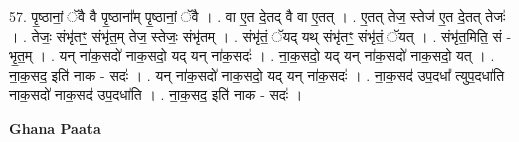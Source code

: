 \documentclass[17pt]{extarticle}
\begin{document}
57. पृ॒ष्ठानां॒ ॅवै वै पृ॒ष्ठाना᳚म् पृ॒ष्ठानां॒ ॅवै । . वा ए॒त दे॒तद् वै वा ए॒तत् । . ए॒तत् तेज॒ स्तेज॑ ए॒त दे॒तत् तेजः॑ । . तेजः॒ संभृ॑तꣳ॒॒ संभृ॑त॒म् तेज॒ स्तेजः॒ संभृ॑तम् । . संभृ॑तं॒ ॅयद् यथ् संभृ॑तꣳ॒॒ संभृ॑तं॒ ॅयत् । . संभृ॑त॒मिति॒ सं - भृ॒त॒म् । . यन् ना॑क॒सदो॑ नाक॒सदो॒ यद् यन् ना॑क॒सदः॑ । . ना॒क॒सदो॒ यद् यन् ना॑क॒सदो॑ नाक॒सदो॒ यत् । . ना॒क॒सद॒ इति॑ नाक - सदः॑ । . यन् ना॑क॒सदो॑ नाक॒सदो॒ यद् यन् ना॑क॒सदः॑ । . ना॒क॒सद॑ उप॒दधा᳚ त्युप॒दधा॑ति नाक॒सदो॑ नाक॒सद॑ उप॒दधा॑ति । . ना॒क॒सद॒ इति॑ नाक - सदः॑ । \newline

\textbf{Ghana Paata } \newline
\end{document}
